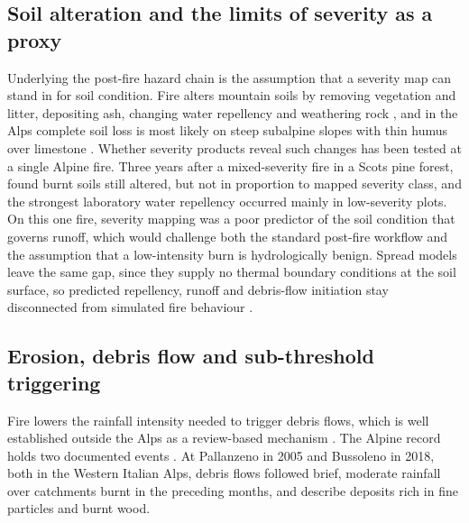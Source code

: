 \documentclass[11pt,a4paper]{article}
\begin{document}
\subsection{Soil alteration and the limits of severity as a proxy}

Underlying the post-fire hazard chain is the assumption that a severity map can stand in for soil condition. Fire alters mountain soils by removing vegetation and litter, depositing ash, changing water repellency and weathering rock \citep{santi_wildfire_2022}, and in the Alps complete soil loss is most likely on steep subalpine slopes with thin humus over limestone \citep{muller_forest_2020}. Whether severity products reveal such changes has been tested at a single Alpine fire. Three years after a mixed-severity fire in a Scots pine forest, \citet{negri_wildfire_2026} found burnt soils still altered, but not in proportion to mapped severity class, and the strongest laboratory water repellency occurred mainly in low-severity plots. On this one fire, severity mapping was a poor predictor of the soil condition that governs runoff, which would challenge both the standard post-fire workflow and the assumption that a low-intensity burn is hydrologically benign. Spread models leave the same gap, since they supply no thermal boundary conditions at the soil surface, so predicted repellency, runoff and debris-flow initiation stay disconnected from simulated fire behaviour \citep{or_review_2023}.

\subsection{Erosion, debris flow and sub-threshold triggering}

Fire lowers the rainfall intensity needed to trigger debris flows, which is well established outside the Alps as a review-based mechanism \citep{santi_wildfire_2022, rengers_evaluating_2024}. The Alpine record holds two documented events \citep{tiranti_wildfires_2021, laporta_postwildfire_2025}. At Pallanzeno in 2005 and Bussoleno in 2018, both in the Western Italian Alps, debris flows followed brief, moderate rainfall over catchments burnt in the preceding months, and \citet{tiranti_wildfires_2021} describe deposits rich in fine particles and burnt wood.
\end{document}
